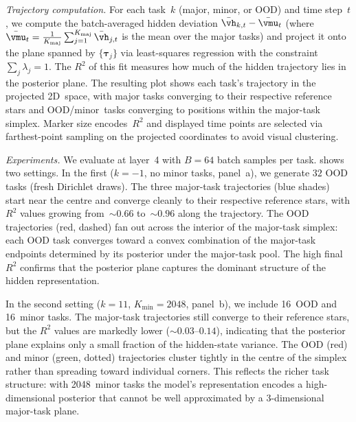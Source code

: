 \emph{Trajectory computation.}
For each task~$k$ (major, minor, or OOD) and time step~$t$, we compute the
batch-averaged hidden deviation
$\bar{\vh}_{k,t} - \bar{\vmu}_t$
(where
$\bar{\vmu}_t = \frac{1}{K_{\mathrm{maj}}}\sum_{j=1}^{K_{\mathrm{maj}}}
  \bar{\vh}_{j,t}$
is the mean over the major tasks) and project it onto the
plane spanned by $\{\bm{\tau}_j\}$ via least-squares regression with the
constraint $\sum_j \lambda_j = 1$.
The $R^2$ of this fit measures how much of the hidden trajectory lies in the
posterior plane.
The resulting plot shows each task's trajectory in the projected 2D~space, with
major tasks converging to their respective reference stars and OOD/minor~tasks
converging to positions within the major-task simplex.
Marker size encodes~$R^2$ and displayed time points are selected via
farthest-point sampling on the projected coordinates to avoid visual
clustering.

\emph{Experiments.}
We evaluate at layer~4 with $B = 64$ batch samples per task.
 shows two settings.
In the first ($k = -1$, no minor tasks, panel~a), we generate $32$ OOD tasks
(fresh Dirichlet draws).
The three major-task trajectories (blue shades) start near the centre and
converge cleanly to their respective reference stars, with $R^2$ values
growing from~${\sim}0.66$ to~${\sim}0.96$ along the trajectory.
The OOD trajectories (red, dashed) fan out across the interior of the
major-task simplex: each OOD task converges toward a convex combination of the
major-task endpoints determined by its posterior under the major-task pool.
The high final~$R^2$ confirms that the posterior plane captures the dominant
structure of the hidden representation.

In the second setting ($k = 11$, $K_{\mathrm{min}} = 2048$, panel~b), we
include 16~OOD and 16~minor tasks.
The major-task trajectories still converge to their reference stars, but the
$R^2$ values are markedly lower (${\sim}0.03$--$0.14$), indicating that the
posterior plane explains only a small fraction of the hidden-state variance.
The OOD (red) and minor (green, dotted) trajectories cluster tightly in the
centre of the simplex rather than spreading toward individual corners.
This reflects the richer task structure: with 2048~minor tasks the model's
representation encodes a high-dimensional posterior that cannot be well
approximated by a 3-dimensional major-task plane.

